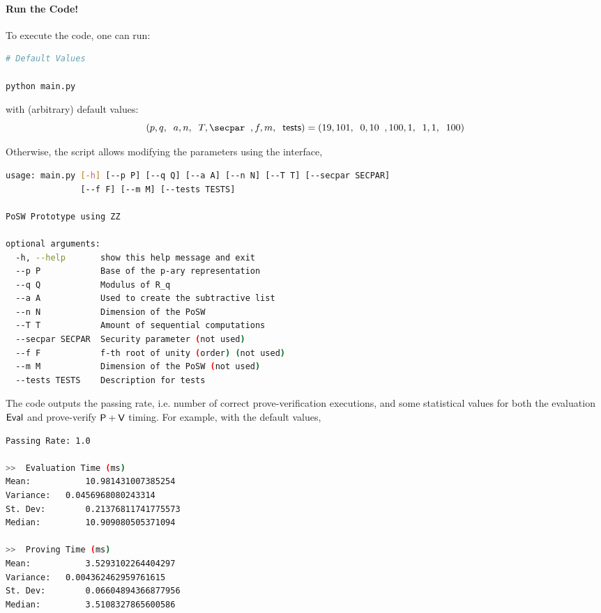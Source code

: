 \paragraph{Run the Code!}
To execute the code, one can run:
\begin{lstlisting}[language=Bash]
# Default Values

python main.py 
\end{lstlisting}
with (arbitrary) default values:
\[ (\pprime,\qprime,\;\;a,n,\;\;T,\secpar\;\;,f,m,\;\;\msf{tests}) =
	(19,101,\;\;0,10\;\;,100,1,\;\;1,1,\;\;100) \]

Otherwise, the script allows modifying the parameters using the interface,

\begin{lstlisting}[language=Bash]
usage: main.py [-h] [--p P] [--q Q] [--a A] [--n N] [--T T] [--secpar SECPAR]
               [--f F] [--m M] [--tests TESTS]

PoSW Prototype using ZZ

optional arguments:
  -h, --help       show this help message and exit
  --p P            Base of the p-ary representation
  --q Q            Modulus of R_q
  --a A            Used to create the subtractive list
  --n N            Dimension of the PoSW
  --T T            Amount of sequential computations
  --secpar SECPAR  Security parameter (not used)
  --f F            f-th root of unity (order) (not used)
  --m M            Dimension of the PoSW (not used)
  --tests TESTS    Description for tests
\end{lstlisting}

The code outputs the passing rate, i.e. number of correct prove-verification executions,
and some statistical values for both the evaluation $\textsf{Eval}$ and prove-verify $\textsf{P}+\textsf{V}$
timing.
%
For example, with the default values,
\begin{lstlisting}[language=Bash]
Passing Rate: 1.0

>>  Evaluation Time (ms)
Mean: 			10.981431007385254
Variance: 	0.0456968080243314
St. Dev: 		0.21376811741775573
Median: 		10.909080505371094

>>  Proving Time (ms)
Mean: 			3.5293102264404297
Variance: 	0.004362462959761615
St. Dev: 		0.06604894366877956
Median: 		3.5108327865600586
\end{lstlisting}

\vspace{2mm}

